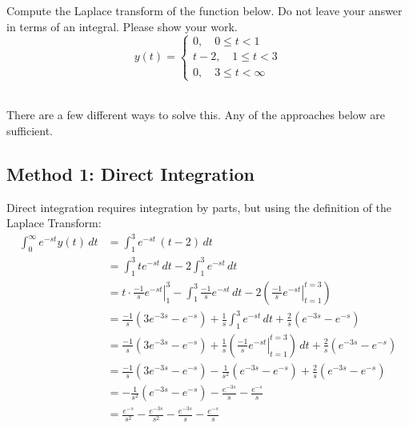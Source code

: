 \ifnum {}
\newpage 
\fi

\ifnum {}    
\question[2] 
Compute the Laplace transform of the function below. Do not leave your answer in terms of an integral. Please show your work. 
$$y(t) = \begin{cases} 0, \quad 0 \le t < 1 \\ t-2, \quad 1 \le t < 3 \\ 0, \quad 3 \le t < \infty\end{cases}$$
\ifnum {} {\color{DarkBlue} \\[12pt] 
There are a few different ways to solve this. Any of the approaches below are sufficient. 
\subsection*{Method 1: Direct Integration }
Direct integration requires integration by parts, but using the definition of the Laplace Transform:
    \begin{align}
        \int_0^{\infty} e^{-st} y(t) \, dt 
        &= \int_1^{3} e^{-st} \, (t-2) \, dt \\
        &= \int_1^{3} te^{-st}  \, dt - 2 \int_1^{3} e^{-st}  \, dt \\
        &=  \left. t\cdot \frac{-1}{s}e^{-st} \right|_1^3
        - \int_1^{3} \frac{-1}{s}e^{-st} \, dt 
        -2 \left( \left. \frac{-1}{s}e^{-st}\right|_{t=1}^{t=3}\right) \\
        &=  \frac{-1}{s}\left( 3e^{-3s} - e^{-s} \right)  
        + \frac{1}{s} \int_1^{3} e^{-st} \, dt 
        + \frac{2}{s} \left(  e^{-3s} - e^{-s} \right) \\
        &=  \frac{-1}{s}\left( 3e^{-3s} - e^{-s} \right)  
        + \frac{1}{s} \left( \left. \frac{-1}{s}e^{-st}\right|_{t=1}^{t=3}\right) \, dt 
        + \frac{2}{s} \left(  e^{-3s} - e^{-s} \right) \\     
        &=  \frac{-1}{s}\left( 3e^{-3s} - e^{-s} \right)  
        - \frac{1}{s^2} \left(  e^{-3s} - e^{-s} \right) 
        + \frac{2}{s} \left(  e^{-3s} - e^{-s} \right) \\      
        &= - \frac{1}{s^2} \left(  e^{-3s} - e^{-s} \right) 
        - \frac{ e^{-3s}}{s}   - \frac{e^{-s}}{s}  \\   
        &= \frac{e^{-s}}{s^2} - \frac{e^{-3s}}{s^2} 
        - \frac{ e^{-3s}}{s}   - \frac{e^{-s}}{s}           
    \end{align}
}
